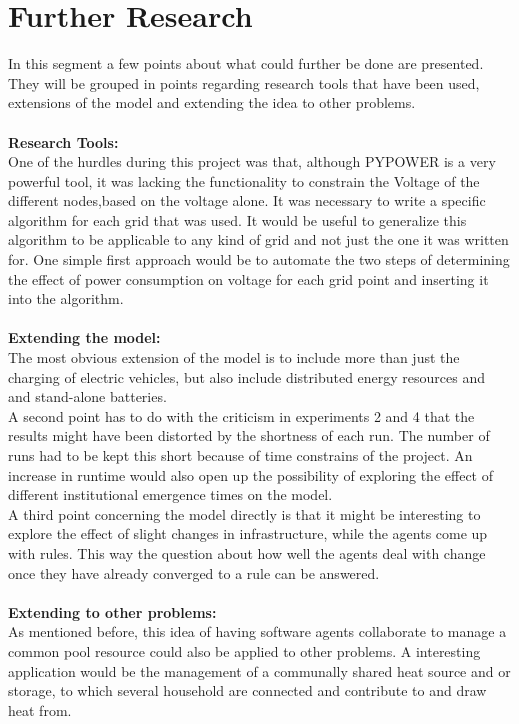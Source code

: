 \documentclass[a4paper]{article}
\begin{document}
\section{Further Research}
In this segment a few points about what could further be done are presented. They will be grouped in points regarding research tools that
have been used, extensions of the model and extending the idea to other problems. \\ \\
\textbf{Research Tools:}\\
One of the hurdles during this project was that, although PYPOWER is a very powerful tool, it was lacking the functionality to 
constrain the Voltage of the different nodes,based on the voltage alone. It was necessary to write a specific algorithm for each 
grid that was used. It would be useful to generalize this algorithm to be applicable to any kind of grid and not just the one it was 
written for. One simple first approach would be to automate the two steps of determining the effect of power consumption on 
voltage for each grid point and inserting it into  the algorithm.
\\
\\
\textbf{Extending the model:}\\
The most obvious extension of the model is to include more than just the charging of electric vehicles, but also include distributed 
energy resources and and stand-alone batteries. \\
A second point has to do with the criticism in experiments 2 and 4 that the results might have been distorted by the shortness of each run. 
The number of runs had to be kept this short because of time constrains of the project. An increase in runtime would also open up the 
possibility of exploring the effect of different institutional emergence times on the model.\\
A third point concerning the model directly is that it might be interesting to explore the effect of slight changes in infrastructure, 
while the agents come up with rules. This way the question about how well the agents deal with change once they have already 
converged to a rule can be answered.
\\
\\
\textbf{Extending to other problems:}\\
As mentioned before, this idea of having software agents collaborate to manage a common pool resource could also be applied to other 
problems. A interesting application would be the management of a communally shared heat source and or storage, to which several 
household are connected and contribute to  and draw heat from. 
\clearpage
\end{document}
